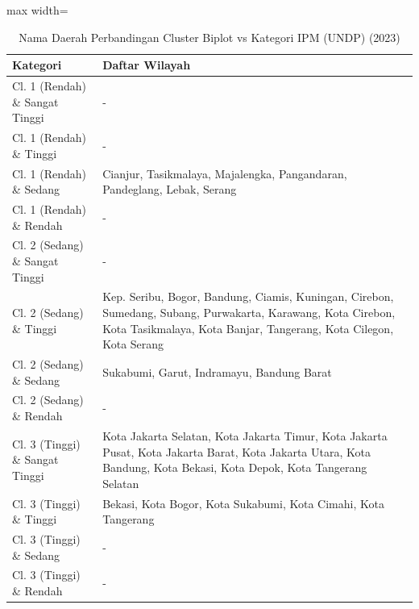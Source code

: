 \begin{table}[H]
\centering
\caption{Nama Daerah Perbandingan Cluster Biplot vs Kategori IPM (UNDP) (2023)} \label{tab:appcrossname2023}
\begin{adjustbox}{max width=\textwidth}
\begin{tabular}{|p{4cm}|p{10cm}|}
\hline
\textbf{Kategori} & \textbf{Daftar Wilayah} \\
\hline
Cl. 1 (Rendah) \& Sangat Tinggi & - \\
\hline
Cl. 1 (Rendah) \& Tinggi & - \\
\hline
Cl. 1 (Rendah) \& Sedang & Cianjur, Tasikmalaya, Majalengka, Pangandaran, Pandeglang, Lebak, Serang \\
\hline
Cl. 1 (Rendah) \& Rendah & - \\
\hline
Cl. 2 (Sedang) \& Sangat Tinggi & - \\
\hline
Cl. 2 (Sedang) \& Tinggi & Kep. Seribu, Bogor, Bandung, Ciamis, Kuningan, Cirebon, Sumedang, Subang, Purwakarta, Karawang, Kota Cirebon, Kota Tasikmalaya, Kota Banjar, Tangerang, Kota Cilegon, Kota Serang \\
\hline
Cl. 2 (Sedang) \& Sedang & Sukabumi, Garut, Indramayu, Bandung Barat \\
\hline
Cl. 2 (Sedang) \& Rendah & - \\
\hline
Cl. 3 (Tinggi) \& Sangat Tinggi & Kota Jakarta Selatan, Kota Jakarta Timur, Kota Jakarta Pusat, Kota Jakarta Barat, Kota Jakarta Utara, Kota Bandung, Kota Bekasi, Kota Depok, Kota Tangerang Selatan \\
\hline
Cl. 3 (Tinggi) \& Tinggi & Bekasi, Kota Bogor, Kota Sukabumi, Kota Cimahi, Kota Tangerang \\
\hline
Cl. 3 (Tinggi) \& Sedang & - \\
\hline
Cl. 3 (Tinggi) \& Rendah & - \\
\hline
\end{tabular}
\end{adjustbox}
\end{table}